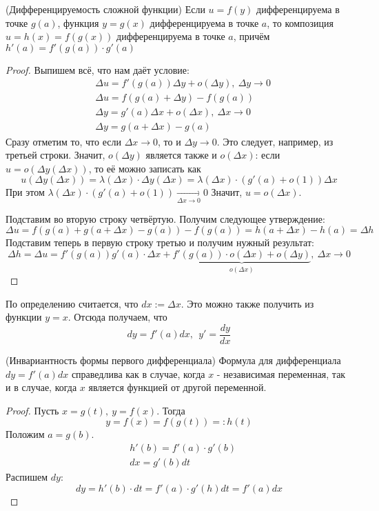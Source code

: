\begin{theorem} (Дифференцируемость сложной функции)
	Если $u = f(y)$ дифференцируема в точке $g(a)$, функция $y = g(x)$ дифференцируема в точке $a$, то композиция $u = h(x) = f(g(x))$ дифференцируема в точке $a$, причём $h'(a) = f'(g(a)) \cdot g'(a)$
\end{theorem}

\begin{proof}
	Выпишем всё, что нам даёт условие:
	\begin{align*}
		&{\Delta u = f'(g(a))\Delta y + o(\Delta y),\ \Delta y \to 0}
		\\
		&{\Delta u = f(g(a) + \Delta y) - f(g(a))}
		\\
		&{\Delta y = g'(a)\Delta x + o(\Delta x),\ \Delta x \to 0}
		\\
		&{\Delta y = g(a + \Delta x) - g(a)}
	\end{align*}
	Сразу отметим то, что если $\Delta x \to 0$, то и $\Delta y \to 0$. Это следует, например, из третьей строки. Значит, $o(\Delta y)$ является также и $o(\Delta x)$: если $u = o(\Delta y(\Delta x))$, то её можно записать как
	\[
		u(\Delta y(\Delta x)) = \lambda(\Delta x) \cdot \Delta y(\Delta x) = \lambda(\Delta x) \cdot (g'(a) + o(1))\Delta x
	\]
	При этом $\lambda(\Delta x) \cdot (g'(a) + o(1)) \xrightarrow[\Delta x \to 0]{} 0$ Значит, $u = o(\Delta x)$.
	
	Подставим во вторую строку четвёртую. Получим следующее утверждение:
	\[
		\Delta u = f(g(a) + g(a + \Delta x) - g(a)) - f(g(a)) = h(a + \Delta x) - h(a) = \Delta h
	\]
	Подставим теперь в первую строку третью и получим нужный результат:
	\[
		\Delta h = \Delta u = f'(g(a))g'(a) \cdot \Delta x + \underbrace{f'(g(a)) \cdot o(\Delta x) + o(\Delta y)}_{o(\Delta x)},\ \Delta x \to 0
	\]
\end{proof}

\begin{note}
	По определению считается, что $dx := \Delta x$. Это можно также получить из функции $y = x$. Отсюда получаем, что
	$$
		dy = f'(a)dx,\ \ y' = \frac{dy}{dx} 
	$$
\end{note}

\begin{corollary} (Инвариантность формы первого дифференциала)
	Формула для дифференциала $dy = f'(a)dx$ справедлива как в случае, когда $x$ - независимая переменная, так и в случае, когда $x$ является функцией от другой переменной.
\end{corollary}

\begin{proof}
	Пусть $x = g(t),\ y = f(x)$. Тогда
	$$
		y = f(x) = f(g(t)) =: h(t)
	$$
	Положим $a = g(b)$.
	\begin{align*}
		&h'(b) = f'(a) \cdot g'(b)
		\\
		&dx = g'(b)dt
	\end{align*}
	Распишем $dy$:
	$$
		dy = h'(b) \cdot dt = f'(a) \cdot g'(h) dt = f'(a) dx
	$$
\end{proof}

